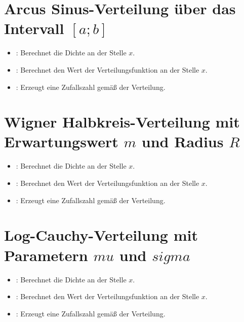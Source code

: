 \section{Arcus Sinus-Verteilung über das Intervall \texorpdfstring{$[a;b]$}{[a;b]}}

\begin{itemize}

\item
{}:
Berechnet die Dichte an der Stelle $x$.

\item
{}:
Berechnet den Wert der Verteilungsfunktion an der Stelle $x$.

\item
{}:
Erzeugt eine Zufallszahl gemäß der Verteilung.

\end{itemize}



\section{Wigner Halbkreis-Verteilung mit Erwartungswert \texorpdfstring{$m$}{m} und Radius \texorpdfstring{$R$}{R}}

\begin{itemize}

\item
{}:
Berechnet die Dichte an der Stelle $x$.

\item
{}:
Berechnet den Wert der Verteilungsfunktion an der Stelle $x$.

\item
{}:
Erzeugt eine Zufallszahl gemäß der Verteilung.

\end{itemize}



\section{Log-Cauchy-Verteilung mit Parametern \texorpdfstring{$mu$}{mu} und \texorpdfstring{$sigma$}{sigma}}

\begin{itemize}

\item
{}:
Berechnet die Dichte an der Stelle $x$.

\item
{}:
Berechnet den Wert der Verteilungsfunktion an der Stelle $x$.

\item
{}:
Erzeugt eine Zufallszahl gemäß der Verteilung.

\end{itemize}



